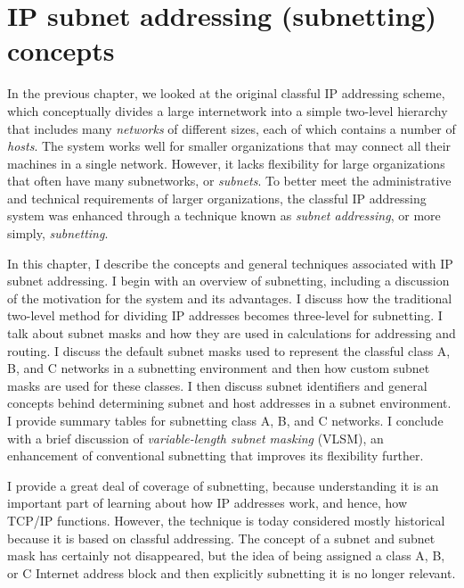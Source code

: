 \chapter{IP subnet addressing (subnetting) concepts}
\label{chap:kozierok-ch18}

In the previous chapter, we looked at the original classful IP
addressing scheme, which conceptually divides a large internetwork into
a simple two-level hierarchy that includes many {\emph{networks}} of
different sizes, each of which contains a number of {\emph{hosts}}. The
system works well for smaller organizations that may connect all their
machines in a single network. However, it lacks flexibility for large
organizations that often have many subnetworks, or {\emph{subnets}}. To
better meet the administrative and technical requirements of larger
organizations, the classful IP addressing system was enhanced through a
technique known as {\emph{subnet addressing}}, or more simply,
{\emph{subnetting}}.

In this chapter, I describe the concepts and general techniques
associated with IP subnet addressing. I begin with an overview of
subnetting, including a discussion of the motivation for the system and
its advantages. I discuss how the traditional two-level method for
dividing IP addresses becomes three-level for subnetting. I talk about
subnet masks and how they are used in calculations for addressing and
routing. I discuss the default subnet masks used to represent the
classful class A, B, and C networks in a subnetting environment and then
how custom subnet masks are used for these classes.
I then discuss subnet identifiers and general concepts behind determining subnet and host addresses in a subnet environment.
I provide summary tables for subnetting class A, B, and C networks.
I conclude with a brief discussion of \emph{variable-length subnet masking} (VLSM), an enhancement of conventional subnetting that improves its flexibility further.

\begin{note}
I provide a great deal of coverage of subnetting, because
understanding it is an important part of learning about how IP addresses
work, and hence, how TCP/IP functions. However, the technique is today
considered mostly historical because it is based on classful
addressing. The concept of a subnet and subnet mask has certainly not
disappeared, but the idea of being assigned a class A, B, or C Internet
address block and then explicitly subnetting it is no longer relevant.
\end{note}


